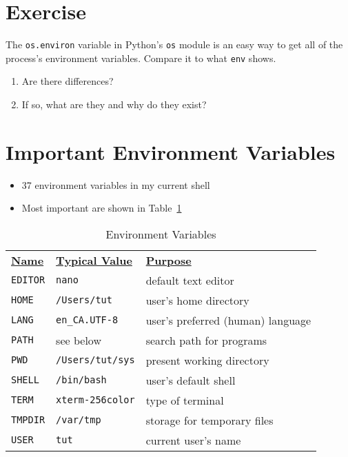 \documentclass[krantzl]{krantz}
\newcommand{\tblref}[1]{Table~\ref{#1}}
\begin{document}
\section{Exercise}

The \texttt{os.environ} variable in Python’s \texttt{os} module
is an easy way to get all of the process’s environment variables.
Compare it to what \texttt{env} shows.

\begin{enumerate}
\item 

Are there differences?



\item 

If so, what are they and why do they exist?



\end{enumerate}
\section{Important Environment Variables}
\begin{itemize}
\item 37 environment variables in my current shell

\item Most important are shown in \tblref{var_common}

\end{itemize}
\begin{table}
\centering
\begin{tabular}{lll}
\textbf{\underline{Name}} & \textbf{\underline{Typical Value}} & \textbf{\underline{Purpose}} \\
\texttt{EDITOR} & \texttt{nano} & default text editor \\
\texttt{HOME} & \texttt{/Users/tut} & user’s home directory \\
\texttt{LANG} & \texttt{en\_CA.UTF-8} & user’s preferred (human) language \\
\texttt{PATH} & see below & search path for programs \\
\texttt{PWD} & \texttt{/Users/tut/sys} & present working directory \\
\texttt{SHELL} & \texttt{/bin/bash} & user’s default shell \\
\texttt{TERM} & \texttt{xterm-256color} & type of terminal \\
\texttt{TMPDIR} & \texttt{/var/tmp} & storage for temporary files \\
\texttt{USER} & \texttt{tut} & current user’s name \\
\end{tabular}
\caption{Environment Variables}
\label{var_common}
\end{table}
\end{document}
